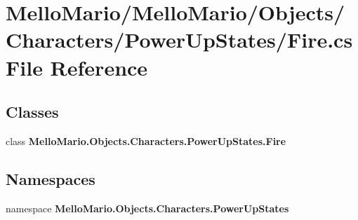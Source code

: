 \section{Mello\+Mario/\+Mello\+Mario/\+Objects/\+Characters/\+Power\+Up\+States/\+Fire.cs File Reference}
\label{Fire_8cs}
\subsection*{Classes}
\begin{DoxyCompactItemize}
\item 
class \textbf{ Mello\+Mario.\+Objects.\+Characters.\+Power\+Up\+States.\+Fire}
\end{DoxyCompactItemize}
\subsection*{Namespaces}
\begin{DoxyCompactItemize}
\item 
namespace \textbf{ Mello\+Mario.\+Objects.\+Characters.\+Power\+Up\+States}
\end{DoxyCompactItemize}
